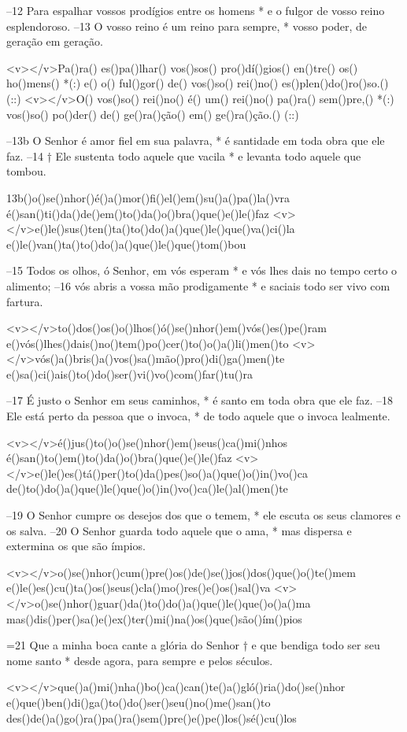 –12 Para espalhar vossos prodígios entre os homens *
e o fulgor de vosso reino esplendoroso.
–13 O vosso reino é um reino para sempre, *
vosso poder, de geração em geração.

<v></v>Pa()ra() es()pa()lhar() vos()sos() pro()dí()gios() en()tre() os() ho()mens() *(:)
e() o() ful()gor() de() vos()so() rei()no() es()plen()do()ro()so.() (::)
<v></v>O() vos()so() rei()no() é() um() rei()no() pa()ra() sem()pre,() *(:)
vos()so() po()der() de() ge()ra()ção() em() ge()ra()ção.() (::)

–13b O Senhor é amor fiel em sua palavra, *
é santidade em toda obra que ele faz.
–14 † Ele sustenta todo aquele que vacila *
e levanta todo aquele que tombou.

13b()o()se()nhor()é()a()mor()fi()el()em()su()a()pa()la()vra
é()san()ti()da()de()em()to()da()o()bra()que()e()le()faz
<v></v>e()le()sus()ten()ta()to()do()a()que()le()que()va()ci()la
e()le()van()ta()to()do()a()que()le()que()tom()bou

–15 Todos os olhos, ó Senhor, em vós esperam *
e vós lhes dais no tempo certo o alimento;
–16 vós abris a vossa mão prodigamente *
e saciais todo ser vivo com fartura.

<v></v>to()dos()os()o()lhos()ó()se()nhor()em()vós()es()pe()ram
e()vós()lhes()dais()no()tem()po()cer()to()o()a()li()men()to
<v></v>vós()a()bris()a()vos()sa()mão()pro()di()ga()men()te
e()sa()ci()ais()to()do()ser()vi()vo()com()far()tu()ra

–17 É justo o Senhor em seus caminhos, *
é santo em toda obra que ele faz.
–18 Ele está perto da pessoa que o invoca, *
de todo aquele que o invoca lealmente.

<v></v>é()jus()to()o()se()nhor()em()seus()ca()mi()nhos
é()san()to()em()to()da()o()bra()que()e()le()faz
<v></v>e()le()es()tá()per()to()da()pes()so()a()que()o()in()vo()ca
de()to()do()a()que()le()que()o()in()vo()ca()le()al()men()te

–19 O Senhor cumpre os desejos dos que o temem, *
ele escuta os seus clamores e os salva.
–20 O Senhor guarda todo aquele que o ama, *
mas dispersa e extermina os que são ímpios.

<v></v>o()se()nhor()cum()pre()os()de()se()jos()dos()que()o()te()mem
e()le()es()cu()ta()os()seus()cla()mo()res()e()os()sal()va
<v></v>o()se()nhor()guar()da()to()do()a()que()le()que()o()a()ma
mas()dis()per()sa()e()ex()ter()mi()na()os()que()são()ím()pios

=21 Que a minha boca cante a glória do Senhor †
e que bendiga todo ser seu nome santo *
desde agora, para sempre e pelos séculos.

<v></v>que()a()mi()nha()bo()ca()can()te()a()gló()ria()do()se()nhor
e()que()ben()di()ga()to()do()ser()seu()no()me()san()to
des()de()a()go()ra()pa()ra()sem()pre()e()pe()los()sé()cu()los